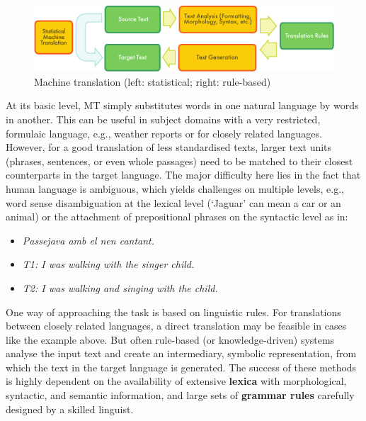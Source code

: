 \begin{multicols}{2}

\begin{figure}[htb]
  \center
  \includegraphics[width=\textwidth]{../_media/english/machine_translation}
  \caption{Machine translation (left: statistical; right: rule-based)}
  \label{fig:mtarch_en}
\end{figure}

At its basic level, MT simply substitutes words in one natural language by words in another. This can be useful in subject domains with a very restricted, formulaic language, e.g., weather reports or for closely related languages. However, for a good translation of less standardised texts, larger text units (phrases, sentences, or even whole passages) need to be matched to their closest counterparts in the target language. The major difficulty here lies in the fact that human language is ambiguous, which yields challenges on multiple levels, e.g., word sense disambiguation at the lexical level (‘Jaguar’ can mean a car or an animal) or the attachment of prepositional phrases on the syntactic level as in:
\begin{itemize}
\item \textit{Passejava amb el nen cantant.}
\item \textit{T1: I was walking with the singer child.}
\item \textit{T2: I was walking and singing with the child.}
\end{itemize}

One way of approaching the task is based on linguistic rules. For translations between closely related languages, a direct translation may be feasible in cases like the example above. But often rule-based (or knowledge-driven) systems analyse the input text and create an intermediary, symbolic representation, from which the text in the target language is generated. The success of these methods is highly dependent on the availability of extensive \textbf{lexica} with morphological, syntactic, and semantic information, and large sets of \textbf{grammar rules} carefully designed by a skilled linguist.


\end{multicols}
